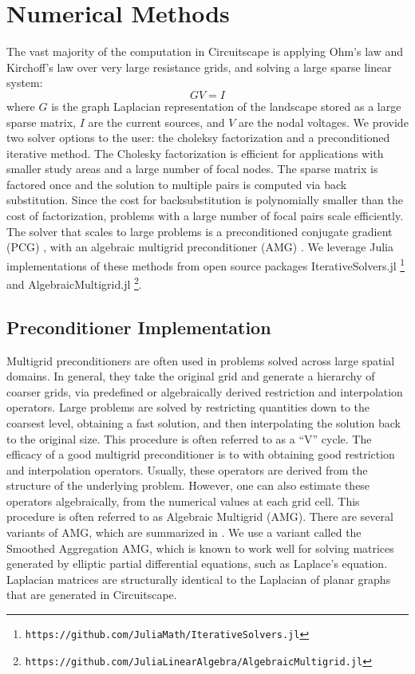\documentclass{juliacon}
\begin{document}
\section{Numerical Methods}
The vast majority of the computation in Circuitscape is applying Ohm’s law and Kirchoff’s law over very large resistance grids, and solving a large sparse linear system: 
$$
GV = I
$$
where $G$ is the graph Laplacian representation of the landscape stored as a large sparse matrix, $I$ are the current sources, and $V$ are the nodal voltages. We provide two solver options to the user: the choleksy factorization and a preconditioned iterative method. The Cholesky factorization \cite{higham2009cholesky} is efficient for applications with smaller study areas and a large number of focal nodes. The sparse matrix is factored once and the solution to multiple pairs is computed via back substitution. Since the cost for backsubstitution is polynomially smaller than the cost of factorization, problems with a large number of focal pairs scale efficiently. The solver that scales to large problems is a preconditioned conjugate gradient (PCG) \cite{trefethen1997numerical}, with an algebraic multigrid preconditioner (AMG) \cite{vanvek1996algebraic}. We leverage Julia implementations of these methods from open source packages IterativeSolvers.jl \footnote{\texttt{https://github.com/JuliaMath/IterativeSolvers.jl}} and AlgebraicMultigrid.jl \footnote{\texttt{https://github.com/JuliaLinearAlgebra/AlgebraicMultigrid.jl}}.

\subsection{Preconditioner Implementation}
Multigrid preconditioners are often used in problems solved across large spatial domains. In general, they take the original grid and generate a hierarchy of coarser grids, via predefined or algebraically derived restriction and interpolation operators. Large problems are solved by restricting quantities down to the coarsest level, obtaining a fast solution, and then interpolating the solution back to the original size. This procedure is often referred to as a “V” cycle. The efficacy of a good multigrid preconditioner is to with obtaining good restriction and interpolation operators. Usually, these operators are derived from the structure of the underlying problem. However, one can also estimate these operators algebraically, from the numerical values at each grid cell. This procedure is often referred to as Algebraic Multigrid (AMG). There are several variants of AMG, which are summarized in \cite{stuben2001review}. We use a variant called the Smoothed Aggregation AMG, which is known to work well for solving matrices generated by elliptic partial differential equations, such as Laplace’s equation. Laplacian matrices are structurally identical to the Laplacian of planar graphs that are generated in Circuitscape.
\end{document}
